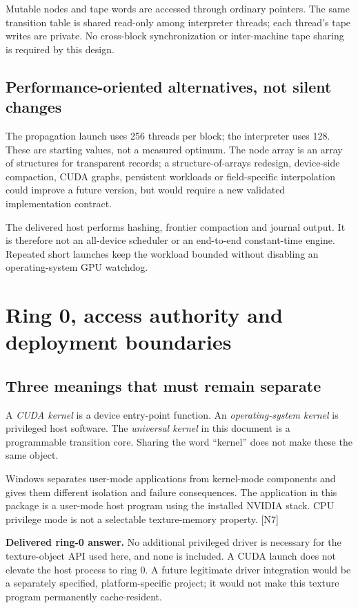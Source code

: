 \documentclass[11pt,a4paper]{article}
\newcommand{\ext}[1]{\textcolor{muted}{[N#1]}}
\begin{document}
Mutable nodes and tape words are accessed through ordinary pointers. The same transition table is shared read-only among interpreter threads; each thread's tape writes are private. No cross-block synchronization or inter-machine tape sharing is required by this design.

\subsection{Performance-oriented alternatives, not silent changes}
The propagation launch uses 256 threads per block; the interpreter uses 128. These are starting values, not a measured optimum. The node array is an array of structures for transparent records; a structure-of-arrays redesign, device-side compaction, CUDA graphs, persistent workloads or field-specific interpolation could improve a future version, but would require a new validated implementation contract.

The delivered host performs hashing, frontier compaction and journal output. It is therefore not an all-device scheduler or an end-to-end constant-time engine. Repeated short launches keep the workload bounded without disabling an operating-system GPU watchdog.
\clearpage

\section{Ring 0, access authority and deployment boundaries}
\subsection{Three meanings that must remain separate}
A \emph{CUDA kernel} is a device entry-point function. An \emph{operating-system kernel} is privileged host software. The \emph{universal kernel} in this document is a programmable transition core. Sharing the word ``kernel'' does not make these the same object.

Windows separates user-mode applications from kernel-mode components and gives them different isolation and failure consequences. The application in this package is a user-mode host program using the installed NVIDIA stack. CPU privilege mode is not a selectable texture-memory property. \ext{7}

\begin{contract}
\textbf{Delivered ring-0 answer.} No additional privileged driver is necessary for the texture-object API used here, and none is included. A CUDA launch does not elevate the host process to ring 0. A future legitimate driver integration would be a separately specified, platform-specific project; it would not make this texture program permanently cache-resident.
\end{contract}
\end{document}
